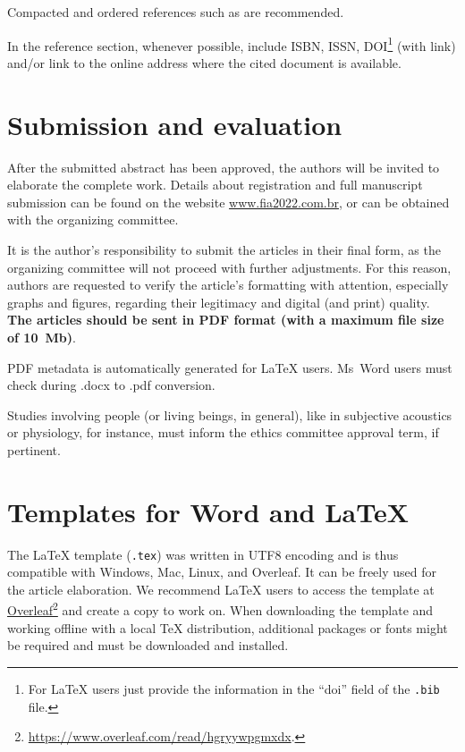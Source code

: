 \documentclass[12pt, a4paper, twoside, twocolumn]{article}
\begin{document}
Compacted and ordered references such as \cite{Mareze-2017,Oppenheim-1996,Muller-2001,Mareze-2019} are recommended.

In the reference section, whenever possible, include ISBN, ISSN, DOI\footnote{For LaTeX users just provide the information in the  ``doi'' field of the  \texttt{.bib} file.} (with link) and/or link to the online address where the cited document is available.

\section{Submission and evaluation}

After the submitted abstract has been approved, the authors will be invited to elaborate the complete work. Details about registration and full manuscript submission can be found on the website \url{www.fia2022.com.br}, or can be obtained with the organizing committee.

It is the author's responsibility to submit the articles in their final form, as the organizing committee will not proceed with further adjustments. For this reason, authors are requested to verify the article's formatting with attention, especially graphs and figures, regarding their legitimacy and digital (and print) quality. \textbf{The articles should be sent in PDF format (with a maximum file size of 10~Mb)}.

PDF metadata is automatically generated for \LaTeX\xspace users. Ms~Word users must check during .docx to .pdf conversion.

Studies involving people (or living beings, in general), like in subjective acoustics or physiology, for instance, must inform the ethics committee approval term, if pertinent.

\section{Templates for Word and \LaTeX}

The \LaTeX\xspace template (\texttt{.tex}) was written in UTF8 encoding and is thus compatible with Windows, Mac, Linux, and Overleaf. It can be freely used for the article elaboration. We recommend \LaTeX{} users to access the template at \href{https://www.overleaf.com/read/hgryywpgmxdx}{Overleaf}\footnote{\url{https://www.overleaf.com/read/hgryywpgmxdx}.} and create a copy to work on. When downloading the template and working offline with a local \TeX{} distribution, additional packages or fonts might be required and must be downloaded and installed.
\end{document}
